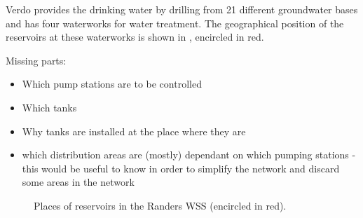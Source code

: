 Verdo provides the drinking water by drilling from 21 different groundwater bases and has four waterworks for water treatment. The geographical position of the reservoirs at these waterworks is shown in , encircled in red.   

Missing parts:
\begin{itemize}
  \item Which pump stations are to be controlled
  \item Which tanks 
  \item Why tanks are installed at the place where they are
  \item which distribution areas are (mostly) dependant on which pumping stations - this would be useful to know in order to simplify the network and discard some areas in the network 
\end{itemize}

\begin{figure}[H]
\centering
 
\caption{Places of reservoirs in the Randers WSS (encircled in red).}
\label{fig:reservoirs_epanet}
\end{figure}